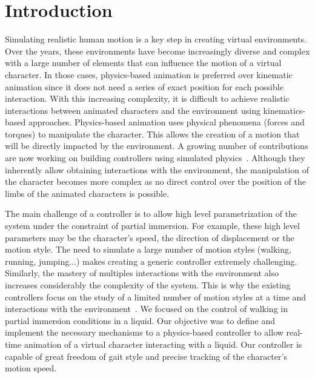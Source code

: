 \documentclass[conference]{acmsiggraph}
\begin{document}
\keywordlist


\section{Introduction}

Simulating realistic human motion is a key step in creating virtual environments. Over the years, these environments have become increasingly diverse and complex with a large number of elements that can influence the motion of a virtual character. In those cases, physics-based animation is preferred over kinematic animation since it does not need a series of exact position for each possible interaction. With this increasing complexity, it is difficult to achieve realistic interactions between animated characters and the environment using kinematics-based approaches. Physics-based animation uses physical phenomena (forces and torques) to manipulate the character. This allows the creation of a motion that will be directly impacted by the environment. A growing number of contributions are now working on building controllers using simulated physics~\cite{geijtenbeek2012interactive}. Although they inherently allow obtaining interactions with the environment, the manipulation of the character becomes more complex as no direct control over the position of the limbs of the animated characters is possible.

The main challenge of a controller is to allow high level parametrization of the system under the constraint of partial immersion. For example, these high level parameters may be the character's speed, the direction of displacement or the motion style. The need to simulate a large number of motion styles (walking, running, jumping...) makes creating a generic controller extremely challenging. Similarly, the mastery of multiples interactions with the environment also increases considerably the complexity of the system. This is why the existing controllers focus on the study of a limited number of motion styles at a time and interactions with the environment~\cite{geijtenbeek2012interactive}. We focused on the control of walking in partial immersion conditions in a liquid. Our objective was to define and implement the necessary mechanisms to a physics-based controller to allow real-time animation of a virtual character interacting with a liquid. Our controller is capable of great freedom of gait style and precise tracking of the character's motion speed.
\end{document}
